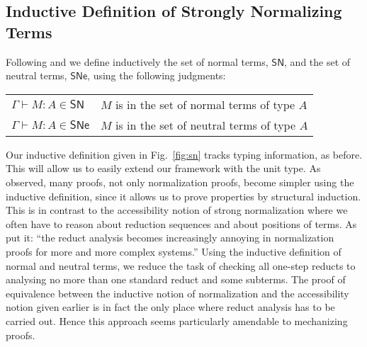 \documentclass{article}
\newcommand{\SN}{\mathsf{SN}}
\newcommand{\SNe}{\mathsf{SNe}}
\begin{document}
\subsection{Inductive Definition of Strongly Normalizing Terms}
Following \cite{Raamsdonk_onnormalisation} and \cite{Joachimski2003} we define inductively the set of normal terms, $\SN$, and the set of neutral terms, $\SNe$, using the following judgments:

\begin{center}
\begin{tabular}{ll}
$\Gamma \vdash M : A \in \SN$  & $M$ is in the set of normal terms of  type $A$\\
$\Gamma \vdash M : A \in \SNe$ & $M$ is in the set of neutral terms of type $A$
\end{tabular}
\end{center}

Our inductive definition given in Fig.~\ref{fig:sn} tracks typing information, as before. This will allow us to easily extend our framework with the unit type.
As \cite{Raamsdonk_onnormalisation} observed, many proofs, not only normalization proofs, become simpler using the inductive definition, since it allows us  to prove properties by structural induction. This is in contrast to the accessibility notion of strong normalization where we often have to reason about reduction sequences and about positions of terms. As \cite{Joachimski2003}  put it: ``the reduct analysis becomes increasingly annoying in normalization proofs for more and more complex systems.'' Using the inductive definition of normal and neutral terms, we reduce the task of checking all one-step reducts to analysing no more than one standard reduct
and some subterms.  The proof of equivalence between the inductive notion of normalization and the accessibility notion given earlier is in fact the only place where reduct analysis has to be carried out.
Hence this approach seems particularly amendable to mechanizing proofs.
\end{document}
